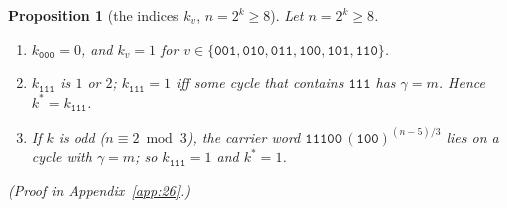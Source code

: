 \documentclass[10pt,a4paper]{article}
\newtheorem{proposition}[theorem]{Proposition}
\newcommand{\kst}{k^{*}}
\newcommand{\code}[1]{\mathtt{#1}}            %
\begin{document}
\begin{proposition}[the indices $k_v$, $n=2^k\ge8$]\label{26:prop:indices}
Let $n=2^k\ge8$.
\begin{enumerate}[label=\textup{(\alph*)},nosep,leftmargin=*]
\item $k_{\code{000}}=0$, and $k_v=1$ for
$v\in\{\code{001},\code{010},\code{011},\code{100},\code{101},\code{110}\}$.
\item $k_{\code{111}}$ is $1$ or $2$; $k_{\code{111}}=1$ iff some cycle that contains $\code{111}$ has $\gamma=m$.
Hence $\kst=k_{\code{111}}$.
\item If $k$ is odd ($n\equiv2 \bmod 3$), the carrier word $\code{11100}\,(\code{100})^{(n-5)/3}$ lies on a cycle
with $\gamma=m$; so $k_{\code{111}}=1$ and $\kst=1$.
\end{enumerate}
(Proof in Appendix~\ref{app:26}.)
\end{proposition}
\end{document}
